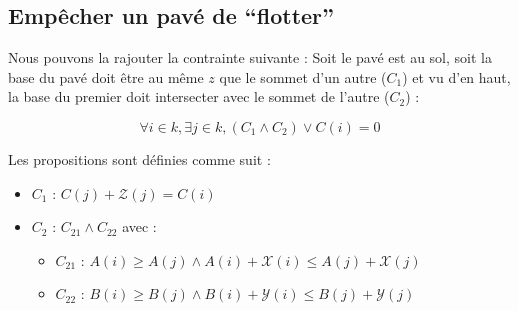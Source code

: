 \documentclass[a4paper]{article}
\begin{document}
\subsection{Empêcher un pavé de ``flotter''}
Nous pouvons la rajouter la contrainte suivante : Soit le pavé est au sol, soit la base du pavé doit être au même $z$ que le sommet d'un autre ($C_1$) et vu d'en haut, la base du premier doit intersecter avec le sommet de l'autre ($C_2$) :

$$\forall i \in k, \exists j \in k, (C_1 \land C_2) \lor C(i) = 0$$

Les propositions sont définies comme suit :
\begin{itemize}
  \item $C_1$ :
  $
  C(j) + \mathcal{Z}(j) = C(i)
  $
  \item $C_2$ : $C_{21} \land C_{22}$ avec :
  \begin{itemize}
    \item $C_{21}$ : $A(i) \geq A(j) \land A(i) + \mathcal{X}(i) \leq A(j) + \mathcal{X}(j)$
    \item $C_{22}$ : $B(i) \geq B(j) \land B(i) + \mathcal{Y}(i) \leq B(j) + \mathcal{Y}(j)$
  \end{itemize}
\end{itemize}
\end{document}
